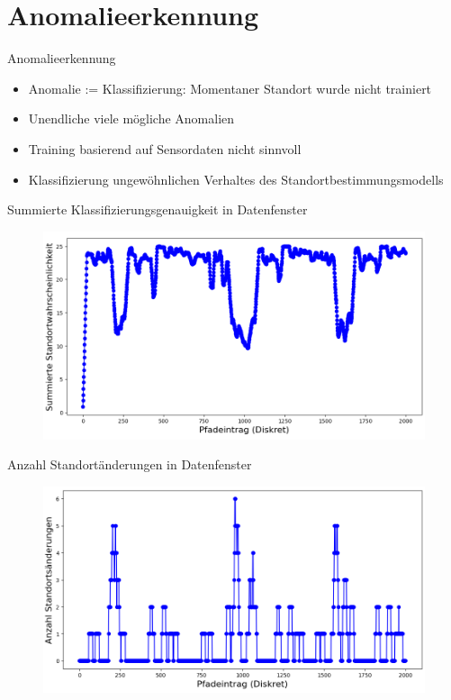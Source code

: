 \documentclass[10pt]{beamer}
\begin{document}
\section{Anomalieerkennung}
\begin{frame}{Anomalieerkennung}
    \begin{itemize}
        \item Anomalie := Klassifizierung: Momentaner Standort wurde nicht trainiert
        \item Unendliche viele mögliche Anomalien
        \item Training basierend auf Sensordaten nicht sinnvoll
        \item Klassifizierung ungewöhnlichen Verhaltes des Standortbestimmungsmodells
    \end{itemize}
\end{frame}

\begin{frame}{Summierte Klassifizierungsgenauigkeit in Datenfenster}
    \begin{figure}
        \centering
        \includegraphics[width=\linewidth]{anomaly_detection/window_conf.png}
    \end{figure}
\end{frame}

\begin{frame}{Anzahl Standortänderungen in Datenfenster}
    \begin{figure}
        \centering
        \includegraphics[width=\linewidth]{anomaly_detection/location_changes.png}
    \end{figure}
\end{frame}
\end{document}
